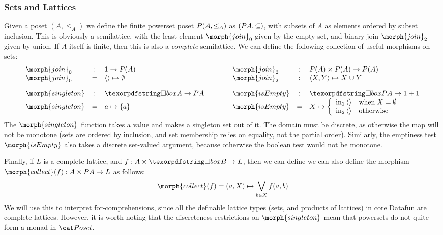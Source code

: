 \subsubsection{Sets and Lattices} Given a poset $(A, \leq_A)$ we
define the finite powerset poset $P (A, \leq_A)$ as
$(P A, \subseteq)$, with subsets of $A$ as elements ordered by
subset inclusion. This is obviously a semilattice, with the least
element $\morph{join}_0$ given by the empty set, and binary join
$\morph{join}_2$ given by union. If $A$ itself is finite, then this is
also a \emph{complete} semilattice.  We can define the following
collection of useful morphisms on sets:
\begin{displaymath}
  \begin{array}{lclclcl}
    \morph{join}_0& : & 1 \to \pfinof(A) & \qquad & \morph{join}_2 & : & \pfinof(A) \times \pfinof(A) \to \pfinof(A) \\
    \morph{join}_0& = & \etuple{} \mapsto \emptyset  &  & \morph{join}_2 & : & \etuple{X, Y} \mapsto X \cup Y \\[1em]
    \morph{singleton} & : & \iso A \to \pfinof{A} & & \morph{isEmpty} & : & \iso \pfinof{A} \to 1 + 1 \\
    \morph{singleton} & = & a \mapsto \esetraw{a} 
    & & 
    \morph{isEmpty} & = & X \mapsto \left\{ \begin{array}{ll}
                                              \inj 1 {\etuple{}} & \mbox{when}\;X = \emptyset \\
                                              \inj 2 {\etuple{}} & \mbox{otherwise}
                                            \end{array}
                                    \right.
  \end{array}
\end{displaymath}
The $\morph{singleton}$ function takes a value and makes a singleton set out of it. The
domain must be discrete, as otherwise the map will not be monotone (sets are ordered by
inclusion, and set membership relies on equality, not the partial order). Similarly,
the emptiness test $\morph{isEmpty}$ also takes a discrete set-valued argument, because
otherwise the boolean test would not be monotone.

Finally, if $L$ is a complete lattice, and $f : A \times \iso B \to L$, then we can define
we can also define the morphism $\morph{collect}(f) : A \times \pfinof{A} \to L$ as follows:
\begin{displaymath}
 \morph{collect}(f)  = (a, X) \mapsto \bigvee_{b \in X} f(a, b)   
\end{displaymath}
We will use this to interpret for-comprehensions, since all the definable lattice
types (sets, and products of lattices) in core Datafun are complete lattices. However,
it is worth noting that the discreteness restrictions on $\morph{singleton}$ mean that
powersets do not quite form a monad in $\Poset$. 

